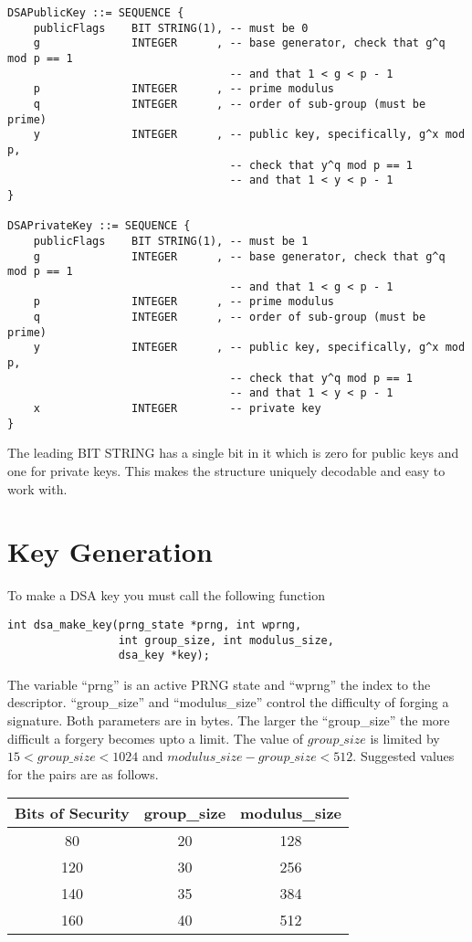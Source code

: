 \documentclass[a4paper]{book}
\begin{document}
\begin{verbatim}
DSAPublicKey ::= SEQUENCE {
    publicFlags    BIT STRING(1), -- must be 0
    g              INTEGER      , -- base generator, check that g^q mod p == 1
                                  -- and that 1 < g < p - 1
    p              INTEGER      , -- prime modulus 
    q              INTEGER      , -- order of sub-group (must be prime)
    y              INTEGER      , -- public key, specifically, g^x mod p, 
                                  -- check that y^q mod p == 1
                                  -- and that 1 < y < p - 1
}

DSAPrivateKey ::= SEQUENCE {
    publicFlags    BIT STRING(1), -- must be 1
    g              INTEGER      , -- base generator, check that g^q mod p == 1
                                  -- and that 1 < g < p - 1
    p              INTEGER      , -- prime modulus 
    q              INTEGER      , -- order of sub-group (must be prime)
    y              INTEGER      , -- public key, specifically, g^x mod p, 
                                  -- check that y^q mod p == 1
                                  -- and that 1 < y < p - 1
    x              INTEGER        -- private key
}
\end{verbatim}

The leading BIT STRING has a single bit in it which is zero for public keys and one for private keys.  This makes the structure uniquely decodable and easy
to work with.

\section{Key Generation}
To make a DSA key you must call the following function
\begin{verbatim}
int dsa_make_key(prng_state *prng, int wprng, 
                 int group_size, int modulus_size, 
                 dsa_key *key);
\end{verbatim}
The variable ``prng'' is an active PRNG state and ``wprng'' the index to the descriptor.  ``group\_size'' and 
``modulus\_size'' control the difficulty of forging a signature.  Both parameters are in bytes.  The larger the
``group\_size'' the more difficult a forgery becomes upto a limit.  The value of $group\_size$ is limited by 
$15 < group\_size < 1024$ and $modulus\_size - group\_size < 512$.  Suggested values for the pairs are as follows.

\begin{center}
\begin{tabular}{|c|c|c|}
\hline \textbf{Bits of Security} & \textbf{group\_size} & \textbf{modulus\_size} \\
\hline 80  & 20 & 128 \\
\hline 120 & 30 & 256 \\
\hline 140 & 35 & 384 \\
\hline 160 & 40 & 512 \\
\hline
\end{tabular}
\end{center}
\end{document}
